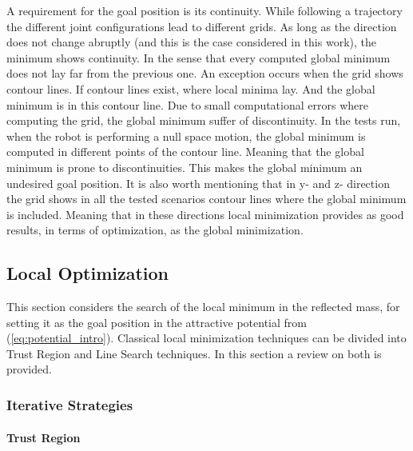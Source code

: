 A requirement for the goal position is its continuity. While following a trajectory the different joint configurations lead to different grids. As long as the direction does not change abruptly (and this is the case considered in this work), the minimum shows continuity. In the sense that every computed global minimum does not lay far from the previous one. An exception occurs when the grid shows contour lines. If contour lines exist, where local minima lay. And the global minimum is in this contour line. Due to small computational errors where computing the grid, the global minimum suffer of discontinuity. In the tests run, when the robot is performing a null space motion, the global minimum is computed in different points of the contour line. Meaning that the global minimum is prone to discontinuities. This makes the global minimum an undesired goal position.
It is also worth mentioning that in y- and z- direction the grid shows in all the tested scenarios contour lines where the global minimum is included. Meaning that in these directions local minimization provides as good results, in terms of optimization, as the global minimization. 




















\subsection{Local Optimization}
\label{ch:localoptimization}
\label{sec:localoptimization}


This section considers the search of the 
local minimum in the reflected mass, for setting it as the goal position in the attractive potential from (\ref{eq:potential_intro}). Classical local minimization techniques can be divided  into Trust Region and Line Search   techniques. In this section a review on both is provided.



\subsubsection{Iterative Strategies}
\label{sec:iterative_strategies}


\paragraph{Trust Region}
\label{subsec:tregion}

